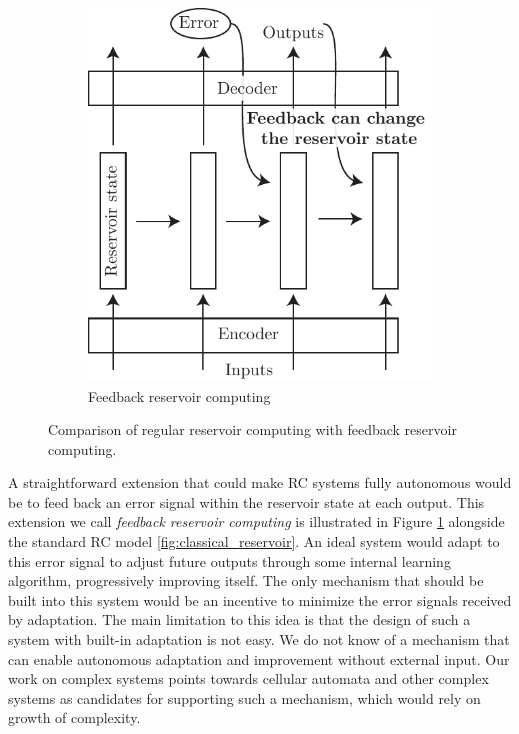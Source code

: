 \begin{figure}[htbp]
\begin{subfigure}[t]{.45\linewidth}
    \includegraphics[width=\linewidth]{figures/feedback_reservoir.pdf}
    \caption{Feedback reservoir computing}
    \label{fig:feedback_reservoir}
  \end{subfigure}
  \caption{Comparison of regular reservoir computing with feedback reservoir
    computing.}
  \label{"waiting for reftex-label call..."}
\end{figure}

A straightforward extension that could make \ac{RC} systems fully autonomous
would be to feed back an error signal within the reservoir state at each
output. This extension we call \emph{feedback reservoir computing} is
illustrated in Figure \ref{fig:feedback_reservoir} alongside the standard
\ac{RC} model \ref{fig:classical_reservoir}. An ideal system would adapt to this
error signal to adjust future outputs through some internal learning algorithm,
progressively improving itself. The only mechanism that should be built into
this system would be an incentive to minimize the error signals received by
adaptation. The main limitation to this idea is that the design of such a system with
built-in adaptation is not easy. We do not know of a mechanism that can enable
autonomous adaptation and improvement without external input. Our work on
complex systems points towards cellular automata and other complex systems as
candidates for supporting such a mechanism, which would rely on growth of
complexity.


